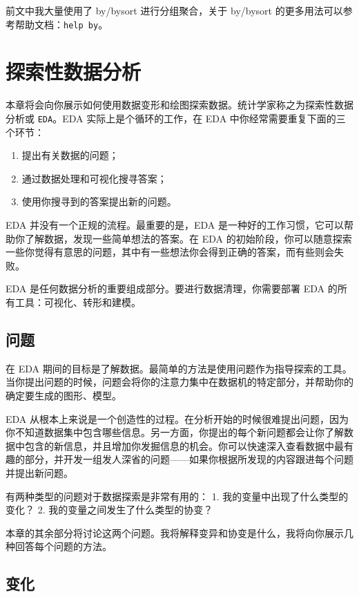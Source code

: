 \documentclass[]{ctexbook}
\providecommand{\tightlist}{%
  \setlength{\itemsep}{0pt}\setlength{\parskip}{0pt}}
\begin{document}
前文中我大量使用了 by/bysort 进行分组聚合，关于 by/bysort 的更多用法可以参考帮助文档：\texttt{help\ by}。

\hypertarget{section-56}{%
\chapter{探索性数据分析}\label{section-56}}

本章将会向你展示如何使用数据变形和绘图探索数据。统计学家称之为探索性数据分析或 \texttt{EDA}。EDA 实际上是个循环的工作，在 EDA 中你经常需要重复下面的三个环节：

\begin{enumerate}
\def\labelenumi{\arabic{enumi}.}
\tightlist
\item
  提出有关数据的问题；
\item
  通过数据处理和可视化搜寻答案；
\item
  使用你搜寻到的答案提出新的问题。
\end{enumerate}

EDA 并没有一个正规的流程。最重要的是，EDA 是一种好的工作习惯，它可以帮助你了解数据，发现一些简单想法的答案。在 EDA 的初始阶段，你可以随意探索一些你觉得有意思的问题，其中有一些想法你会得到正确的答案，而有些则会失败。

EDA 是任何数据分析的重要组成部分。要进行数据清理，你需要部署 EDA 的所有工具：可视化、转形和建模。

\hypertarget{section-57}{%
\section{问题}\label{section-57}}

在 EDA 期间的目标是了解数据。最简单的方法是使用问题作为指导探索的工具。当你提出问题的时候，问题会将你的注意力集中在数据机的特定部分，并帮助你的确定要生成的图形、模型。

EDA 从根本上来说是一个创造性的过程。在分析开始的时候很难提出问题，因为你不知道数据集中包含哪些信息。另一方面，你提出的每个新问题都会让你了解数据中包含的新信息，并且增加你发掘信息的机会。你可以快速深入查看数据中最有趣的部分，并开发一组发人深省的问题------如果你根据所发现的内容跟进每个问题并提出新问题。

有两种类型的问题对于数据探索是非常有用的：
1. 我的变量中出现了什么类型的变化？
2. 我的变量之间发生了什么类型的协变？

本章的其余部分将讨论这两个问题。我将解释变异和协变是什么，我将向你展示几种回答每个问题的方法。

\hypertarget{section-58}{%
\section{变化}\label{section-58}}
\end{document}
